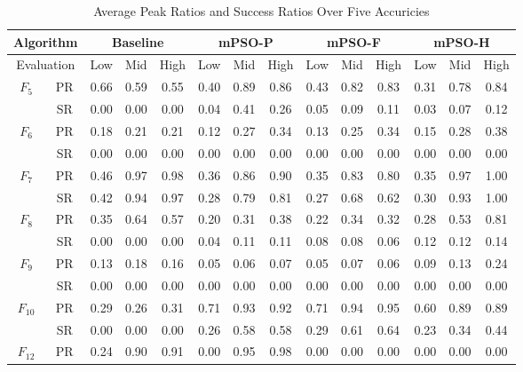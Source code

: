 \begin{table*}[h]
  \centering
  \caption{Average Peak Ratios and Success Ratios Over Five Accuricies}
  \begin{tabular}{|c|c|ccc|ccc|ccc|ccc|}
    \hline
    \multicolumn{2}{|c|}{Algorithm} & \multicolumn{3}{c|}{Baseline} & \multicolumn{3}{c|}{mPSO-P} & \multicolumn{3}{c|}{mPSO-F} & \multicolumn{3}{c|}{mPSO-H} \\
    \hline
    \multicolumn{2}{|c|}{Evaluation} & Low & Mid & High & Low & Mid & High & Low & Mid & High & Low & Mid & High \\
    \hline
    \multirow{2}{*}{$F_{5}$} & PR & 0.66 & 0.59 & 0.55 & 0.40 & 0.89 & 0.86 & 0.43 & 0.82 & 0.83 & 0.31 & 0.78 & 0.84 \\
    & SR & 0.00 & 0.00 & 0.00 & 0.04 & 0.41 & 0.26 & 0.05 & 0.09 & 0.11 & 0.03 & 0.07 & 0.12 \\
    \hline
    \multirow{2}{*}{$F_{6}$} & PR & 0.18 & 0.21 & 0.21 & 0.12 & 0.27 & 0.34 & 0.13 & 0.25 & 0.34 & 0.15 & 0.28 & 0.38 \\
    & SR & 0.00 & 0.00 & 0.00 & 0.00 & 0.00 & 0.00 & 0.00 & 0.00 & 0.00 & 0.00 & 0.00 & 0.00 \\
    \hline
    \multirow{2}{*}{$F_{7}$} & PR & 0.46 & 0.97 & 0.98 & 0.36 & 0.86 & 0.90 & 0.35 & 0.83 & 0.80 & 0.35 & 0.97 & 1.00 \\
    & SR & 0.42 & 0.94 & 0.97 & 0.28 & 0.79 & 0.81 & 0.27 & 0.68 & 0.62 & 0.30 & 0.93 & 1.00 \\
    \hline
    \multirow{2}{*}{$F_{8}$} & PR & 0.35 & 0.64 & 0.57 & 0.20 & 0.31 & 0.38 & 0.22 & 0.34 & 0.32 & 0.28 & 0.53 & 0.81 \\
    & SR & 0.00 & 0.00 & 0.00 & 0.04 & 0.11 & 0.11 & 0.08 & 0.08 & 0.06 & 0.12 & 0.12 & 0.14 \\
    \hline
    \multirow{2}{*}{$F_{9}$} & PR & 0.13 & 0.18 & 0.16 & 0.05 & 0.06 & 0.07 & 0.05 & 0.07 & 0.06 & 0.09 & 0.13 & 0.24 \\
    & SR & 0.00 & 0.00 & 0.00 & 0.00 & 0.00 & 0.00 & 0.00 & 0.00 & 0.00 & 0.00 & 0.00 & 0.00 \\
    \hline
    \multirow{2}{*}{$F_{10}$} & PR & 0.29 & 0.26 & 0.31 & 0.71 & 0.93 & 0.92 & 0.71 & 0.94 & 0.95 & 0.60 & 0.89 & 0.89 \\
    & SR & 0.00 & 0.00 & 0.00 & 0.26 & 0.58 & 0.58 & 0.29 & 0.61 & 0.64 & 0.23 & 0.34 & 0.44 \\
    \hline
    \multirow{2}{*}{$F_{12}$} & PR & 0.24 & 0.90 & 0.91 & 0.00 & 0.95 & 0.98 & 0.00 & 0.00 & 0.00 & 0.00 & 0.00 & 0.00 \\

\end{tabular}
\end{table*}
